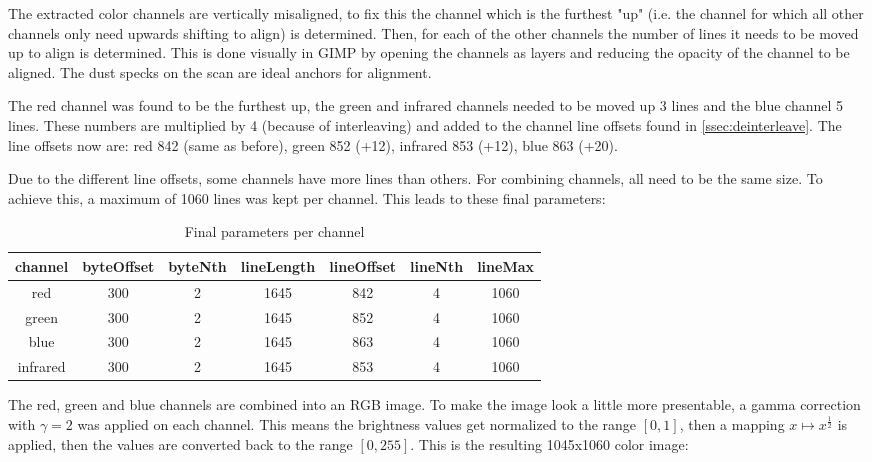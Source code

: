 \documentclass{article}
\begin{document}
The extracted color channels are vertically misaligned, to fix this the
channel which is the furthest "up" (i.e. the channel for which all other channels only need
upwards shifting to align) is determined. Then, for each of the other channels the number
of lines it needs to be moved up to align is determined. This is done visually in GIMP by
opening the channels as layers and reducing the opacity of the channel to be aligned.
The dust specks on the scan are ideal anchors for alignment.

The red channel was found to be the furthest up, the green and infrared channels
needed to be moved up 3 lines and the blue channel 5 lines.
These numbers are multiplied by 4
(because of interleaving) and added to the channel line offsets found in \autoref{ssec:deinterleave}.
The line offsets now are: red 842 (same as before), green 852 (+12), infrared 853 (+12), blue 863 (+20).

Due to the different line offsets, some channels have more lines than others.
For combining channels, all need to be the same size. To achieve this, a maximum
of 1060 lines was kept per channel. This leads to these final parameters:

\begin{table}[H]
  \caption{Final parameters per channel}
  \centering
  \begin{tabular}{c | c | c | c | c | c | c}
    channel & byteOffset & byteNth & lineLength & lineOffset & lineNth & lineMax \\ \hline
    red & 300 & 2 & 1645 & 842 & 4 & 1060 \\
    green & 300 & 2 & 1645 & 852 & 4 & 1060 \\
    blue & 300 & 2 & 1645 & 863 & 4 & 1060 \\
    infrared & 300 & 2 & 1645 & 853 & 4 & 1060 \\
  \end{tabular}
\end{table}

The red, green and blue channels are combined into an RGB image. To make the image look a little
more presentable, a gamma correction with $\gamma = 2$ was applied on each channel.
This means the brightness values get normalized to the range $[0, 1]$,
then a mapping $x \mapsto x^{\frac{1}{2}}$ is applied, then the values are
converted back to the range $[0, 255]$. This is the resulting 1045x1060 color image:
\end{document}
